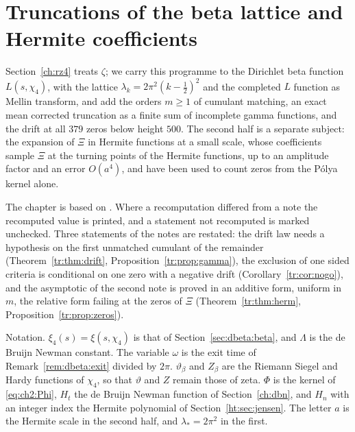\section*{Truncations of the beta lattice and Hermite coefficients}\label{chap:tr}

Section~\ref{ch:rz4} treats $\zeta$; we carry this programme to the Dirichlet beta function $L(s,\chi_4)$, with the lattice $\lambda_k=2\pi^2(k-\frac12)^2$ and the completed $L$ function as Mellin transform, and add the orders $m\ge1$ of cumulant matching, an exact mean corrected truncation as a finite sum of incomplete gamma functions, and the drift at all $379$ zeros below height $500$. The second half is a separate subject: the expansion of $\Xi$ in Hermite functions at a small scale, whose coefficients sample $\Xi$ at the turning points of the Hermite functions, up to an amplitude factor and an error $O(a^4)$, and have been used to count zeros from the P\'olya kernel alone.

The chapter is based on \cite{P26trunc,P26hermite}. Where a recomputation differed from a note the recomputed value is printed, and a statement not recomputed is marked unchecked. Three statements of the notes are restated: the drift law needs a hypothesis on the first unmatched cumulant of the remainder (Theorem~\ref{tr:thm:drift}, Proposition~\ref{tr:prop:gamma}), the exclusion of one sided criteria is conditional on one zero with a negative drift (Corollary~\ref{tr:cor:nogo}), and the asymptotic of the second note is proved in an additive form, uniform in $m$, the relative form failing at the zeros of $\Xi$ (Theorem~\ref{tr:thm:herm}, Proposition~\ref{tr:prop:zeros}).

Notation. $\xi_4(s)=\xi(s,\chi_4)$ is that of Section~\ref{sec:dbeta:beta}, and $\Lambda$ is the de Bruijn Newman constant. The variable $\omega$ is the exit time of Remark~\ref{rem:dbeta:exit} divided by $2\pi$. $\vartheta_\beta$ and $Z_\beta$ are the Riemann Siegel and Hardy functions of $\chi_4$, so that $\vartheta$ and $Z$ remain those of zeta. $\Phi$ is the kernel of \eqref{eq:ch2:Phi}, $H_t$ the de Bruijn Newman function of Section~\ref{ch:dbn}, and $H_n$ with an integer index the Hermite polynomial of Section~\ref{ht:sec:jensen}. The letter $a$ is the Hermite scale in the second half, and $\lambda_*=2\pi^2$ in the first.


